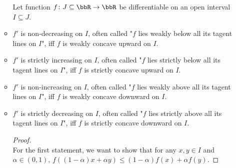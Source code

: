 \documentclass[a4paper,12pt]{report}
\begin{document}
\begin{itemize}
\begin{itemize}
Let function $f\colon J\subseteq\bbR\to\bbR$ be differentiable on an open interval $I\subseteq J$.
\bit
\item $f'$ is non-decreasing on $I$, often called "$f$ lies weakly below all its tagent lines on $I$", iff $f$ is weakly concave upward on $I$.
\item $f'$ is strictly increasing on $I$, often called "$f$ lies strictly below all its tagent lines on $I$", iff $f$ is strictly concave upward on $I$.
\item $f'$ is non-increasing on $I$, often called "$f$ lies weakly above all its tagent lines on $I$", iff $f$ is weakly concave downward on $I$.
\item $f'$ is strictly decreasing on $I$, often called "$f$ lies strictly above all its tagent lines on $I$", iff $f$ is strictly concave downward on $I$.
\eit
\begin{proof}\mbox{}\\
    For the first statement, we want to show that for any $x,y\in I$ and $\alpha\in(0,1)$, $f((1-\alpha)x+\alpha y)\leq(1-\alpha)f(x)+\alpha f(y)$.


\end{proof}
\end{itemize}
\end{itemize}
\end{document}
